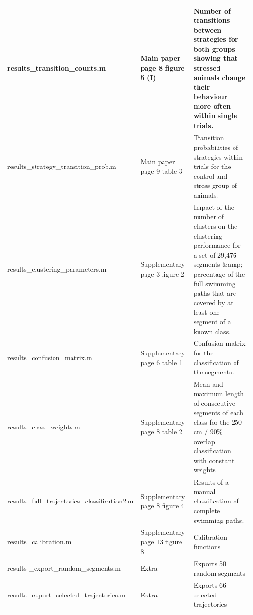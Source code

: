 \documentclass[12pt,titlepage]{article}
\begin{document}
\begin{doublespace}
\begin{table}[H]
{\begin{tabular}{|p{7cm}|p{3cm}|p{14cm}|}
	\\\hline
	results\_transition\_counts.m    & 
	Main paper page 8 figure 5 (I)   & 
	Number of transitions between strategies for both groups showing that stressed animals change their behaviour more often within single trials.                                                        
	\\\hline
	results\_strategy\_transition\_prob.m    & 
	Main paper page 9 table 3                & 
	Transition probabilities of strategies within trials for the control and stress group of animals.                                                                                                     \\\hline
	results\_clustering\_parameters.m    & 
	Supplementary page 3 figure 2        & 
	Impact of the number of clusters on the clustering performance for a set of 29,476 segments \&amp; percentage of the full swimming paths that are covered by at least one segment of a known class.
	\\\hline
	results\_confusion\_matrix.m  & 
	Supplementary page 6 table 1  & 
	Confusion matrix for the classification of the segments.                                                                                                                                              \\\hline
	results\_class\_weights.m     & 
	Supplementary page 8 table 2  & 
	Mean and maximum length of consecutive segments of each class for the 250 cm / 90\% overlap classification with constant weights                                                   
	\\\hline
	results\_full\_trajectories\_classification2.m & 
	Supplementary page 8 figure 4                  & 
	Results of a manual classification of complete swimming paths.                                                    
	\\\hline
	results\_calibration.m          &
	Supplementary page 13 figure 8  & 
	Calibration functions                                                                                                                                                                                 \\\hline
	results \_export\_random\_segments.m  & Extra                                 & 
	Exports 50 random segments                                                                                                                                                                            \\\hline
	results\_export\_selected\_trajectories.m & Extra                                     & 
	Exports 66 selected trajectories     
	\\\hline        
	\end{tabular}}
\end{table}


\end{doublespace}
\end{document}
